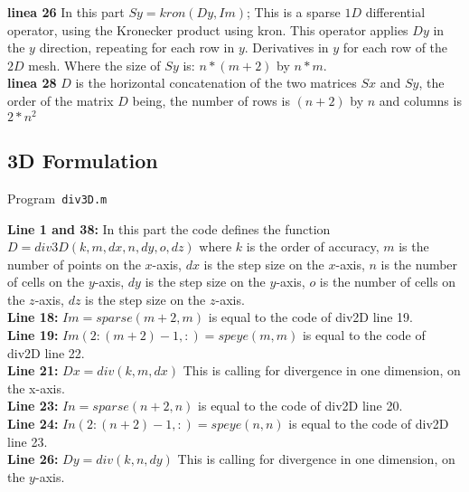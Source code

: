\textbf{linea 26} In this part $Sy = kron(Dy, Im)$; This is a sparse $1D$ differential operator, using the Kronecker product using kron. This operator applies $Dy$ in the $y$ direction, repeating for each row in $y$. Derivatives in $y$ for each row of the $2D$ mesh. Where the size of $Sy$ is: $n*(m+2)$ by $n*m$.\\

\textbf{linea 28} $D$ is the horizontal concatenation of the two matrices $Sx$ and $Sy$, the order of the matrix $D$ being, the number of rows is $(n+2)$ by $n$ and columns is $2*n^{2}$\\

\subsection{3D Formulation}

\begin{octavelisting}
	\tiny
	\centering
	\caption{Program~\texttt{div3D.m}}
	\label{code:div3D.m}
\end{octavelisting}

\textbf{Line 1 and 38:} In this part the code defines the function $D = div3D(k, m, dx,n,dy, o, dz)$ where $k$ is the order of accuracy, $m$ is the number of points on the $x$-axis, $dx$ is the step size on the $x$-axis, $n$ is the number of cells on the $y$-axis, $dy$ is the step size on the $y$-axis, $o$ is the number of cells on the $z$-axis, $dz$ is the step size on the $z$-axis. \\

\textbf{Line 18:} $Im = sparse(m+2,m)$ is equal to the code of div2D line 19.\\

\textbf{Line 19:} $ Im(2:(m + 2) - 1, :) = speye(m, m)$ is equal to the code of div2D line 22.\\

\textbf{Line 21:} $Dx = div(k, m, dx)$ This is calling for divergence in one dimension, on the x-axis.\\

\textbf{Line 23:} $In = sparse(n+2,n)$ is equal to the code of div2D line 20.\\

\textbf{Line 24:} $ In(2:(n + 2) - 1, :) = speye(n, n)$ is equal to the code of div2D line 23.\\

\textbf{Line 26:} $Dy = div(k, n, dy)$ This is calling for divergence in one dimension, on the $y$-axis.\\

